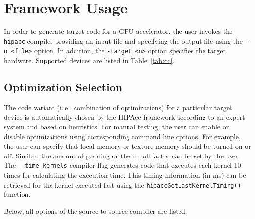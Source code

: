 \section{Framework Usage}
In order to generate target code for a \ac{GPU} accelerator, the user invokes the \verb|hipacc| compiler providing an input file and specifying the output file using the \verb|-o <file>| option.
In addition, the \verb|-target <n>| option specifies the target hardware. Supported devices are listed in Table~\ref{tab:cc}.

\subsection{Optimization Selection}
The code variant (i.\,e., combination of optimizations) for a particular target device is automatically chosen by the \ac{HIPAcc} framework according to an expert system and based on heuristics.
For manual testing, the user can enable or disable optimizations using corresponding command line options.
For example, the user can specify that local memory or texture memory should be turned on or off.
Similar, the amount of padding or the unroll factor can be set by the user.
The \verb|--time-kernels| compiler flag generates code that executes each kernel 10 times for calculating the execution time.
This timing information (in ms) can be retrieved for the kernel executed last using the \verb|hipaccGetLastKernelTiming()| function.

Below, all options of the source-to-source compiler are listed.

